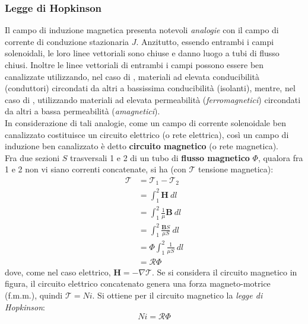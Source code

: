 \documentclass{article}
\begin{document}
\subsubsection{Legge di Hopkinson}
Il campo di induzione magnetica {} presenta notevoli \textit{analogie} con il campo di corrente di conduzione stazionaria $J$. Anzitutto, essendo entrambi i campi solenoidali, le loro linee vettoriali sono chiuse e danno luogo a tubi di flusso chiusi. Inoltre le linee vettoriali di entrambi i campi possono essere ben canalizzate utilizzando, nel caso di {}, materiali ad elevata conducibilità (conduttori) circondati da altri a bassissima conducibilità (isolanti), mentre, nel caso di {}, utilizzando materiali ad elevata permeabilità (\textit{ferromagnetici}) circondati da altri a bassa permeabilità (\textit{amagnetici}).\\
In considerazione di tali analogie, come un campo di corrente solenoidale ben canalizzato costituisce un circuito elettrico (o rete elettrica), così un campo di induzione ben canalizzato è detto \textbf{circuito magnetico} (o rete magnetica). 
\vspace*{0.1cm}\\
Fra due sezioni $S$ trasversali 1 e 2 di un tubo di \textbf{flusso magnetico} $\Phi$, qualora fra 1 e 2 non vi siano correnti concatenate, si ha (con $\mathcal{T}$ tensione magnetica):
\begin{align*}
    \mathcal{T} &= \mathcal{T}_1 - \mathcal{T}_2
    \\
    &=\int_1^2 \mathbf{H} \ dl 
    \\
    &=\int_1^2 \frac{1}{\mu}\mathbf{B} \ dl 
    \\
    &=\int_1^2 \frac{\mathbf{B}S}{\mu S} \ dl 
    \\
    &=\Phi \int_1^2 \frac{1}{\mu S} \ dl
    \\
    &=\mathcal{R}\Phi
\end{align*}
dove, come nel caso elettrico, $\mathbf{H} = - \nabla \mathcal{T}$. Se si considera il circuito magnetico in figura, il circuito elettrico concatenato genera una forza magneto-motrice (f.m.m.), quindi $\mathcal{T}=Ni$. Si ottiene per il circuito magnetico la \textit{legge di Hopkinson}:
\[Ni = \mathcal{R}\Phi\]
\end{document}
